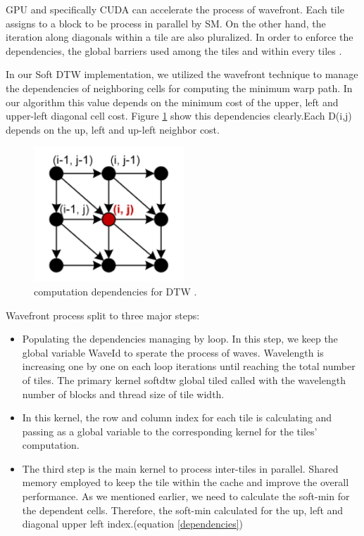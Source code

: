 \documentclass[12pt, letterpaper]{article}
\begin{document}
GPU and specifically CUDA can accelerate the process of wavefront. Each tile
assigns to a block to be process in parallel by SM. On the other hand, the
iteration along diagonals within a tile are also pluralized. In order to enforce
the dependencies, the global barriers used among the tiles and within every
tiles \cite{belviranli_peerwave_2015}.

In our Soft DTW implementation, we utilized the wavefront technique to manage
the dependencies of neighboring cells for computing the minimum warp path. In
our algorithm this value depends on the minimum cost of the upper, left and
upper-left diagonal cell cost. Figure \ref{DTW_dependency} show this
dependencies clearly.Each D(i,j) depends on the up, left and up-left neighbor
cost.

\begin{figure}[htbp]
\includegraphics[height=2in]{img/tiling_dependencies.png}
\centering
\caption{computation dependencies for DTW \cite{belviranli_peerwave_2015}.}
\label{DTW_dependency}
\end{figure}

Wavefront process split to three major steps:

\begin{itemize}
  \item Populating the dependencies managing by loop. In this step, we keep the
    global variable WaveId to sperate the process of waves. Wavelength is
    increasing one by one on each loop iterations until reaching the total
    number of tiles. The primary kernel softdtw global tiled called with the
    wavelength number of blocks and thread size of tile width.
  \item In this kernel, the row and column index for each tile is calculating
    and passing as a global variable to the corresponding kernel for the tiles’
    computation.
  \item The third step is the main kernel to process inter-tiles in
    parallel. Shared memory employed to keep the tile within the cache and
    improve the overall performance. As we mentioned earlier, we need to
    calculate the soft-min for the dependent cells. Therefore, the soft-min
    calculated for the up, left and diagonal upper left index.(equation
    \ref{dependencies})
\end{itemize}
\end{document}

